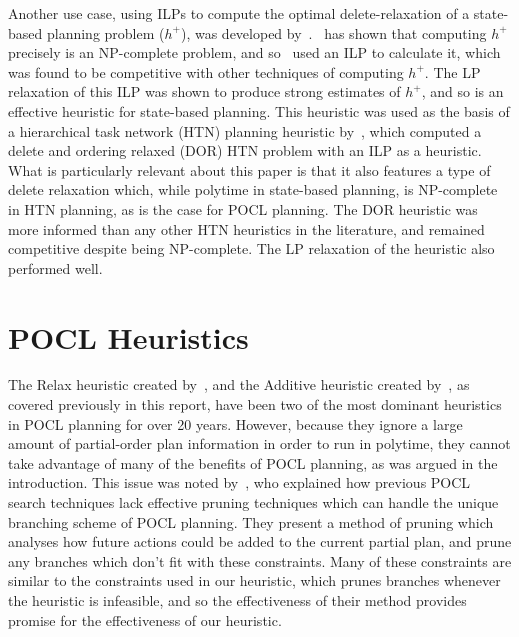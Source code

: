 Another use case, using ILPs to compute the optimal delete-relaxation of a state-based planning problem ($h^+$), was developed by~\cite{Imai2015ILPDeleteRelaxedPlanning}.~\cite{Bylander1994ComplexityOfSTRIPS} has shown that computing $h^+$ precisely is an NP-complete problem, and so~\cite{Imai2015ILPDeleteRelaxedPlanning} used an ILP to calculate it, which was found to be competitive with other techniques of computing $h^+$. The LP relaxation of this ILP was shown to produce strong estimates of $h^+$, and so is an effective heuristic for state-based planning. This heuristic was used as the basis of a hierarchical task network (HTN) planning heuristic by~\cite{Hoeller2020ILP}, which computed a delete and ordering relaxed (DOR) HTN problem with an ILP as a heuristic. What is particularly relevant about this paper is that it also features a type of delete relaxation which, while polytime in state-based planning, is NP-complete in HTN planning, as is the case for POCL planning. The DOR heuristic was more informed than any other HTN heuristics in the literature, and remained competitive despite being NP-complete. The LP relaxation of the heuristic also performed well.\\


\section{POCL Heuristics}

The Relax heuristic created by~\cite{Nguyen2001UCPOPAndRelaxHeuristic}, and the Additive heuristic created by~\cite{Younes2003VHPOPAndAdditiveHeuristic}, as covered previously in this report, have been two of the most dominant heuristics in POCL planning for over 20 years. However, because they ignore a large amount of partial-order plan information in order to run in polytime, they cannot take advantage of many of the benefits of POCL planning, as was argued in the introduction. This issue was noted by~\cite{Vidal2006ConstraintPOCL}, who explained how previous POCL search techniques lack effective pruning techniques which can handle the unique branching scheme of POCL planning. They present a method of pruning which analyses how future actions could be added to the current partial plan, and prune any branches which don't fit with these constraints. Many of these constraints are similar to the constraints used in our heuristic, which prunes branches whenever the heuristic is infeasible, and so the effectiveness of their method provides promise for the effectiveness of our heuristic.\\

